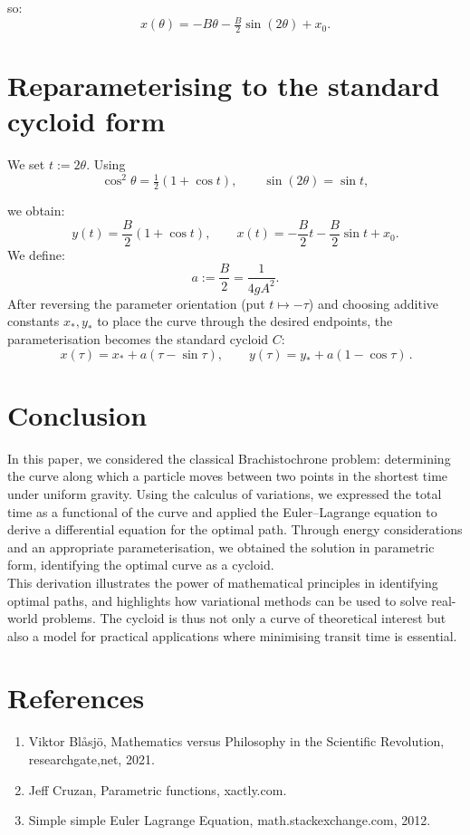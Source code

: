 \documentclass{article}
\begin{document}
so:
\begin{equation}
    x(\theta)= -B\theta -\tfrac{B}{2}\sin(2\theta) + x_0.
\end{equation}

\section{Reparameterising to the standard cycloid form}
We set \(t := 2\theta\). Using
\begin{equation}
    \cos^2\theta=\tfrac{1}{2}(1+\cos t),\qquad \sin(2\theta)=\sin t,
\end{equation}

we obtain:
\begin{equation}
    y(t)=\frac{B}{2}(1+\cos t),\qquad
x(t)= -\frac{B}{2}t -\frac{B}{2}\sin t + x_0.
\end{equation}
We define:
\begin{equation}
    a:=\dfrac{B}{2}=\dfrac{1}{4gA^2}.
\end{equation} 
After reversing the parameter orientation (put \(t\mapsto -\tau\)) and choosing additive constants \(x_*,y_*\) to place the curve through the desired endpoints, the parameterisation becomes the standard cycloid $C$:
\begin{equation}
    \boxed{\,x(\tau)=x_* + a(\tau-\sin\tau),\qquad
y(\tau)=y_* + a(1-\cos\tau)\,.}
\end{equation}
\section{Conclusion}
In this paper, we considered the classical Brachistochrone problem: determining the curve along which a particle moves between two points in the shortest time under uniform gravity. Using the calculus of variations, we expressed the total time as a functional of the curve and applied the Euler–Lagrange equation to derive a differential equation for the optimal path. Through energy considerations and an appropriate parameterisation, we obtained the solution in parametric form, identifying the optimal curve as a cycloid.
\\
This derivation illustrates the power of mathematical principles in identifying optimal paths, and highlights how variational methods can be used to solve real-world problems. The cycloid is thus not only a curve of theoretical interest but also a model for practical applications where minimising transit time is essential.
\section*{References}
\begin{enumerate}
    \item Viktor Blåsjö, Mathematics versus Philosophy in the Scientific Revolution, researchgate,net, 2021.
    \item Jeff Cruzan, Parametric functions, xactly.com.
    \item Simple simple Euler Lagrange Equation, math.stackexchange.com, 2012.
\end{enumerate}
\end{document}
